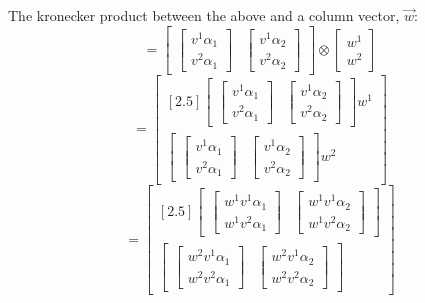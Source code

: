 \documentclass{report}
\begin{document}
The kronecker product between the above and a column vector, $\vec{w}$:
$$ = \begin{bmatrix} \begin{bmatrix} v^1 \alpha_1 \\ v^2 \alpha_1 \end{bmatrix} & \begin{bmatrix} v^1 \alpha_2 \\ v^2 \alpha_2 \end{bmatrix}   \end{bmatrix} \otimes \begin{bmatrix} w^1 \\ w^2 \end{bmatrix}  $$ 
$$ = \begin{bmatrix}[2.5] \begin{bmatrix} \begin{bmatrix} v^1 \alpha_1 \\ v^2 \alpha_1 \end{bmatrix} & \begin{bmatrix} v^1 \alpha_2 \\ v^2 \alpha_2 \end{bmatrix} \end{bmatrix} w^1 \\  \begin{bmatrix} \begin{bmatrix} v^1 \alpha_1 \\ v^2 \alpha_1 \end{bmatrix} & \begin{bmatrix} v^1 \alpha_2 \\ v^2 \alpha_2 \end{bmatrix} \end{bmatrix} w^2 \end{bmatrix}   $$ 
$$ = \begin{bmatrix}[2.5] \begin{bmatrix} \begin{bmatrix} w^1 v^1 \alpha_1 \\ w^1 v^2 \alpha_1 \end{bmatrix} & \begin{bmatrix} w^1 v^1 \alpha_2 \\ w^1 v^2 \alpha_2 \end{bmatrix} \end{bmatrix}  \\  \begin{bmatrix} \begin{bmatrix} w^2 v^1 \alpha_1 \\ w^2 v^2 \alpha_1 \end{bmatrix} & \begin{bmatrix} w^2 v^1 \alpha_2 \\ w^2 v^2 \alpha_2 \end{bmatrix} \end{bmatrix} \end{bmatrix}   $$ 
\end{document}
